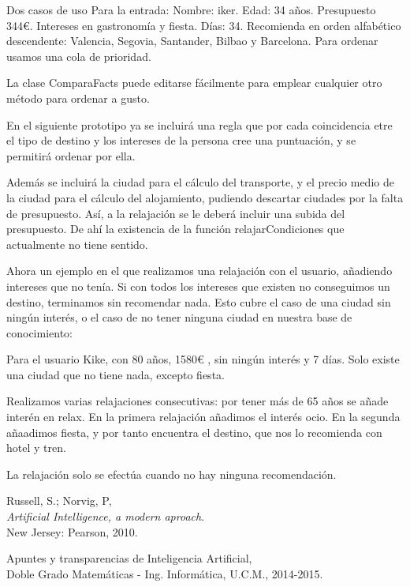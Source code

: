 \documentclass[11pt, a4paper, spanish, openright, twoside]{book}
\begin{document}
\begin{section}{Dos casos de uso}
	Para la entrada: Nombre: iker. Edad: 34 años. Presupuesto 344€. Intereses en gastronomía y fiesta. Días: 34.
	Recomienda en orden alfabético descendente: Valencia, Segovia, Santander,  Bilbao y Barcelona. Para ordenar usamos 
	una cola de prioridad.
	
	 La clase ComparaFacts puede editarse fácilmente para emplear cualquier otro método para ordenar a gusto.
	  
	 En el siguiente prototipo ya se incluirá una regla que por cada coincidencia etre el tipo de destino y los intereses de 
	 la persona cree una puntuación, y se permitirá ordenar por ella.
	 
	 Además se incluirá la ciudad para el cálculo del transporte, y el precio medio de la ciudad para el cálculo del alojamiento, 
	 pudiendo descartar ciudades por la falta de presupuesto. Así, a la relajación se le deberá incluir una subida del presupuesto.
	 De ahí la existencia de la función relajarCondiciones que actualmente no tiene  sentido.
	 
	 Ahora un ejemplo en el que realizamos una relajación con el usuario, añadiendo intereses que no tenía. Si con todos los intereses que existen no conseguimos un destino, terminamos sin recomendar nada. Esto cubre el caso de una ciudad sin ningún interés, o el caso de no tener ninguna ciudad en nuestra base de conocimiento:
	 
	 Para el usuario Kike, con 80 años, 1580€ , sin ningún interés y 7 días. Solo existe una ciudad que no tiene nada, excepto 
	 fiesta.
	 
	 Realizamos varias relajaciones consecutivas: por tener más de 65 años se añade interén en relax. En la primera 
	 relajación añadimos el interés ocio. En la segunda añaadimos fiesta, y por tanto encuentra el destino, que nos lo 
	 recomienda con hotel y tren. 
	 
	 La relajación solo se efectúa cuando no hay ninguna recomendación.
	 
	 
	 
	
\end{section}

	
\begin{thebibliography}{9}

	Russell, S.; Norvig, P, \\
	\emph{Artificial Intelligence, a modern aproach}.\\
	New Jersey: Pearson, 2010.
	
	Apuntes y transparencias de Inteligencia Artificial, \\
	Doble Grado Matemáticas - Ing. Informática, U.C.M., 2014-2015.

\end{thebibliography}
\end{document}
